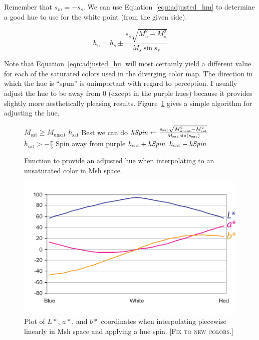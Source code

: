 \documentclass[review,journal]{vgtc}         %
\newcommand{\sticky}[1]{\textsc{[#1]}}
\newcommand{\Msh}{Msh\xspace}
\begin{document}
Remember that $s_m=-s_s$.  We can use Equation~\ref{eqn:adjusted_hm} to
determine a good hue to use for the white point (from the given side).

\begin{equation}
  h_u = h_s \pm \frac{s_s \sqrt{M_u^2 - M_s^2}}{M_s \sin s_s}
  \label{eqn:adjusted_hu}
\end{equation}

Note that Equation~\ref{eqn:adjusted_hu} will most certainly yield a
different value for each of the saturated colors used in the diverging
color map.  The direction in which the hue is ``spun'' is unimportant with
regard to perception.  I usually adjust the hue to be away from 0 (except
in the purple hues) because it provides slightly more aesthetically
pleasing results.  Figure~\ref{fig:AdjustHue} gives a simple algorithm for
adjusting the hue.

\begin{figure}
  \begin{codebox}
    \li \If $M_\mathrm{sat} \geq M_\mathrm{unsat}$
    \li \Then \Return $h_\mathrm{sat}$ \RComment Best we can do
    \li \Else $\id{hSpin} \leftarrow
                 \frac{s_\mathrm{sat}\sqrt{M_\mathrm{unsat}^2-M_\mathrm{sat}^2}}
		      {M_\mathrm{sat} \sin(s_\mathrm{sat})}$
    \li       \If $h_\mathrm{sat} > -\frac{\pi}{3}$ \RComment Spin away from purple
    \li       \Then \Return $h_\mathrm{sat} + \id{hSpin}$
    \li       \Else \Return $h_\mathrm{sat} - \id{hSpin}$
              \End
        \End
  \end{codebox}
  \caption{Function to provide an adjusted hue when interpolating to an
    unsaturated color in \Msh space.}
  \label{fig:AdjustHue}
\end{figure}

\begin{figure}
  \centering
  \includegraphics{images/HueSpinPlot}
  \caption{Plot of $L*$, $a*$, and $b*$ coordinates when interpolating
    piecewise linearly in \Msh space and applying a hue spin. \sticky{Fix
      to new colors.}}
  \label{fig:hue_spin_plot}
\end{figure}
\end{document}
